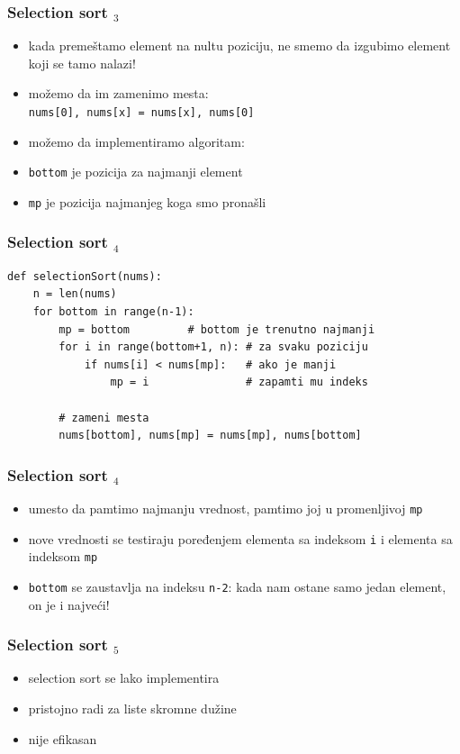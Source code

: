 \documentclass[utf8,compress]{beamer}
\begin{document}
\begin{frame}[fragile]
  \frametitle{Selection sort $_3$}
  \begin{itemize}
    \item kada premeštamo element na nultu poziciju, ne smemo da izgubimo element koji se tamo nalazi!
    \item možemo da im zamenimo mesta: \\
      \texttt{nums[0], nums[x] = nums[x], nums[0]}
    \item možemo da implementiramo algoritam:
    \item \texttt{bottom} je pozicija za najmanji element
    \item \texttt{mp} je pozicija najmanjeg koga smo pronašli
  \end{itemize}
\end{frame}

\begin{frame}[fragile]
  \frametitle{Selection sort $_4$}
\begin{verbatim}
def selectionSort(nums):
    n = len(nums)
    for bottom in range(n-1):
        mp = bottom         # bottom je trenutno najmanji
        for i in range(bottom+1, n): # za svaku poziciju
            if nums[i] < nums[mp]:   # ako je manji
                mp = i               # zapamti mu indeks

        # zameni mesta
        nums[bottom], nums[mp] = nums[mp], nums[bottom]
\end{verbatim}
\end{frame}

\begin{frame}[fragile]
  \frametitle{Selection sort $_4$}
  \begin{itemize}
    \item umesto da pamtimo najmanju vrednost, pamtimo joj  u promenljivoj \texttt{mp}
    \item nove vrednosti se testiraju poređenjem elementa sa indeksom \texttt{i} i elementa sa indeksom \texttt{mp}
    \item \texttt{bottom} se zaustavlja na indeksu \texttt{n-2}: kada nam ostane samo jedan element, on je i najveći!
  \end{itemize}
\end{frame}

\begin{frame}[fragile]
  \frametitle{Selection sort $_5$}
  \begin{itemize}
    \item selection sort se lako implementira
    \item pristojno radi za liste skromne dužine
    \item nije efikasan
  \end{itemize}
\end{frame}
\end{document}
